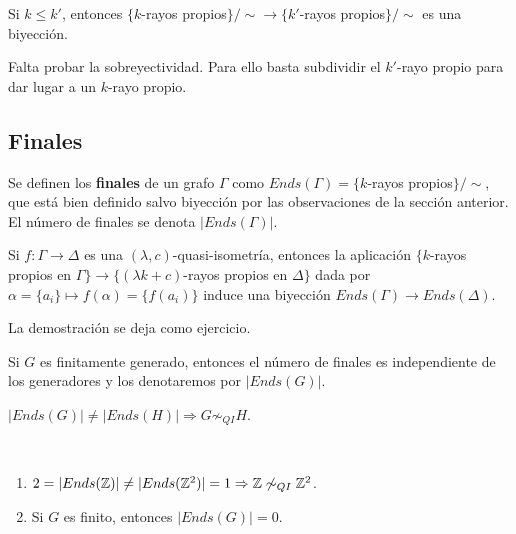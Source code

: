 \documentclass[twoside, 11pt]{article}
\begin{document}
\begin{prop}
Si $k\leq k'$, entonces $\{ k$-rayos propios$\}/\sim\longrightarrow\{k'$-rayos propios$\}/\sim$ es una biyección. 
\end{prop}
\begin{dem}
Falta probar la sobreyectividad. Para ello basta subdividir el $k'$-rayo propio para dar lugar a un $k$-rayo propio. 
\QED
\end{dem}

\subsection{Finales}

\begin{defi}
Se definen los \textbf{finales} de un grafo $\Gamma$ como $Ends(\Gamma)=\{ k$-rayos propios$\}/\sim$, que está bien definido salvo biyección por las observaciones de la sección anterior. El número de finales se denota $|Ends(\Gamma)|$.
\end{defi}

\begin{lemma}
Si $f:\Gamma\to\Delta$ es una $(\lambda,c)$-quasi-isometría, entonces la aplicación $\{ k$-rayos propios en $\Gamma\}\longrightarrow\{(\lambda k+c)$-rayos propios en $\Delta\}$ dada por $\alpha=\{a_i\}\mapsto f(\alpha)=\{f(a_i)\}$ induce una biyección $Ends(\Gamma)\to Ends(\Delta)$. 
\end{lemma}

La demostración se deja como ejercicio.
%

\begin{coro}
Si $G$ es finitamente generado, entonces el número de finales es independiente de los generadores y los denotaremos por $|Ends(G)|$.
\end{coro}

\begin{coro}
$|Ends(G)|\neq |Ends(H)|\Rightarrow G\not\sim_{QI} H$.
\end{coro}

\begin{ejs}\
\begin{enumerate}
\item $2=|Ends(\mathbb{Z})|\neq |Ends(\mathbb{Z}^2)|=1\Rightarrow \mathbb{Z}\not\sim_{QI}\mathbb{Z}^2$.
\item Si $G$ es finito, entonces $|Ends(G)|=0$.
\end{enumerate}
\end{ejs}
\end{document}
